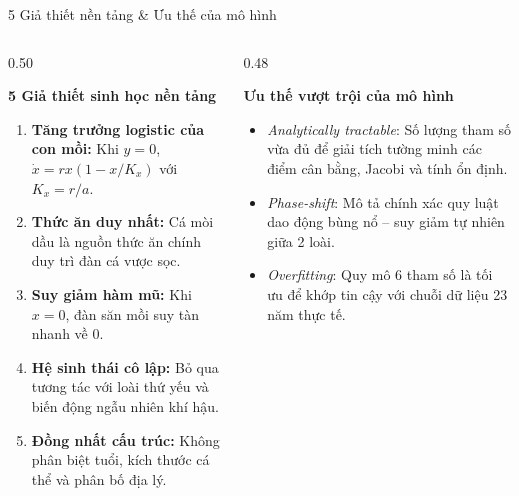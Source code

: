 \documentclass[aspectratio=169, 10pt]{beamer}
\begin{document}
\begin{frame}{5 Giả thiết nền tảng \& Ưu thế của mô hình}
  \begin{columns}[t]
    \begin{column}{0.50\textwidth}
      \begin{block}{\textbf{5 Giả thiết sinh học nền tảng}}
        \footnotesize
        \begin{enumerate}
          \item \textbf{Tăng trưởng logistic của con mồi:} Khi $y=0$, $\dot{x} = rx(1 - x/K_x)$ với $K_x = r/a$.
          \item \textbf{Thức ăn duy nhất:} Cá mòi dầu là nguồn thức ăn chính duy trì đàn cá vược sọc.
          \item \textbf{Suy giảm hàm mũ:} Khi $x=0$, đàn săn mồi suy tàn nhanh về 0.
          \item \textbf{Hệ sinh thái cô lập:} Bỏ qua tương tác với loài thứ yếu và biến động ngẫu nhiên khí hậu.
          \item \textbf{Đồng nhất cấu trúc:} Không phân biệt tuổi, kích thước cá thể và phân bố địa lý.
        \end{enumerate}
      \end{block}
    \end{column}

    \begin{column}{0.48\textwidth}
      \begin{exampleblock}{\textbf{Ưu thế vượt trội của mô hình}}
        \footnotesize
        \begin{itemize}
          \item \textit{Analytically tractable}: Số lượng tham số vừa đủ để giải tích tường minh các điểm cân bằng, Jacobi và tính ổn định.
          \item \textit{Phase-shift}: Mô tả chính xác quy luật dao động bùng nổ -- suy giảm tự nhiên giữa 2 loài.
          \item \textit{Overfitting}: Quy mô 6 tham số là tối ưu để khớp tin cậy với chuỗi dữ liệu 23 năm thực tế.
        \end{itemize}
      \end{exampleblock}
    \end{column}
  \end{columns}
\end{frame}
\end{document}
